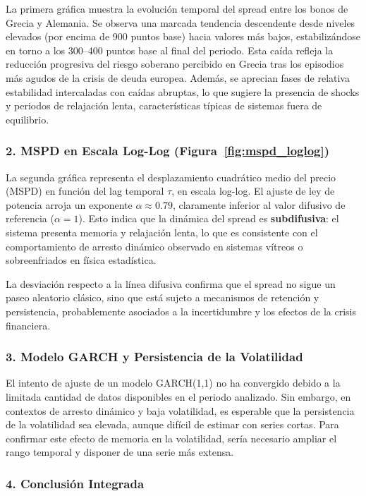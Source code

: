 \documentclass[12pt,a4paper]{article}
\begin{document}
La primera gráfica muestra la evolución temporal del spread entre los bonos de Grecia y Alemania. Se observa una marcada tendencia descendente desde niveles elevados (por encima de 900 puntos base) hacia valores más bajos, estabilizándose en torno a los 300--400 puntos base al final del periodo. Esta caída refleja la reducción progresiva del riesgo soberano percibido en Grecia tras los episodios más agudos de la crisis de deuda europea. Además, se aprecian fases de relativa estabilidad intercaladas con caídas abruptas, lo que sugiere la presencia de shocks y periodos de relajación lenta, características típicas de sistemas fuera de equilibrio.

\subsubsection*{2. MSPD en Escala Log-Log (Figura~\ref{fig:mspd_loglog})}

La segunda gráfica representa el desplazamiento cuadrático medio del precio (MSPD) en función del lag temporal $\tau$, en escala log-log. El ajuste de ley de potencia arroja un exponente $\alpha \approx 0.79$, claramente inferior al valor difusivo de referencia ($\alpha=1$). Esto indica que la dinámica del spread es \textbf{subdifusiva}: el sistema presenta memoria y relajación lenta, lo que es consistente con el comportamiento de arresto dinámico observado en sistemas vítreos o sobreenfriados en física estadística.

La desviación respecto a la línea difusiva confirma que el spread no sigue un paseo aleatorio clásico, sino que está sujeto a mecanismos de retención y persistencia, probablemente asociados a la incertidumbre y los efectos de la crisis financiera.

\subsubsection*{3. Modelo GARCH y Persistencia de la Volatilidad}

El intento de ajuste de un modelo GARCH(1,1) no ha convergido debido a la limitada cantidad de datos disponibles en el periodo analizado. Sin embargo, en contextos de arresto dinámico y baja volatilidad, es esperable que la persistencia de la volatilidad sea elevada, aunque difícil de estimar con series cortas. Para confirmar este efecto de memoria en la volatilidad, sería necesario ampliar el rango temporal y disponer de una serie más extensa.

\subsubsection*{4. Conclusión Integrada}
\end{document}
